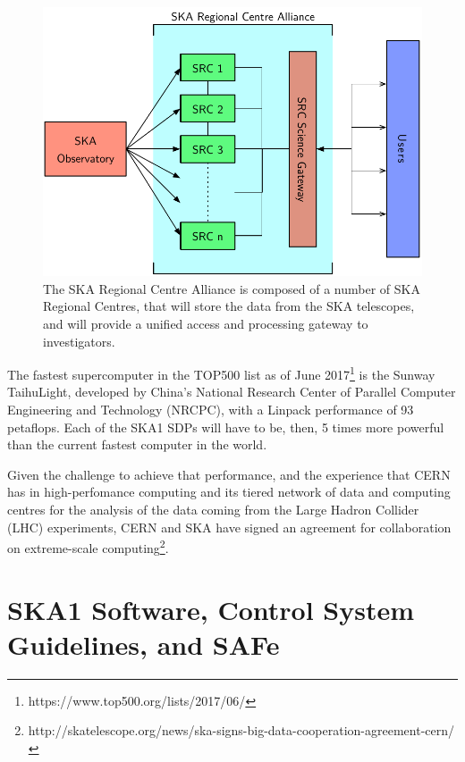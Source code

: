 \documentclass[a4paper,
               biblatex,       %
               keeplastbox,    %
               ]{jacow-2_1}    %
\begin{document}
\begin{figure}[!tb]
  \centering
    \includegraphics[width=\columnwidth]{FRAPL01f7}
  \caption{The SKA Regional Centre Alliance is composed of a number of SKA Regional Centres, that will store the data from the SKA telescopes, and will provide a unified access and processing gateway to investigators.}
  \label{fig:SRCs}
\end{figure}

The fastest supercomputer in the TOP500 list as of June 2017\footnote{https://www.top500.org/lists/2017/06/} is the Sunway TaihuLight, developed by China’s National Research Center of Parallel Computer Engineering and Technology (NRCPC), with a Linpack performance of 93 petaflops. Each of the SKA1 SDPs will have to be, then, 5 times more powerful than the current fastest computer in the world.

Given the challenge to achieve that performance, and the experience that CERN has in high-perfomance computing and its tiered network of data and computing centres for the analysis of the data coming from the Large Hadron Collider (LHC) experiments, CERN and SKA have signed an agreement for collaboration on extreme-scale computing\footnote{http://skatelescope.org/news/ska-signs-big-data-cooperation-agreement-cern/}.


\section{SKA1 Software, Control System Guidelines, and SAFe} %
\label{sec:ska1_software_control_system_guidelines_SAFe}
\end{document}

